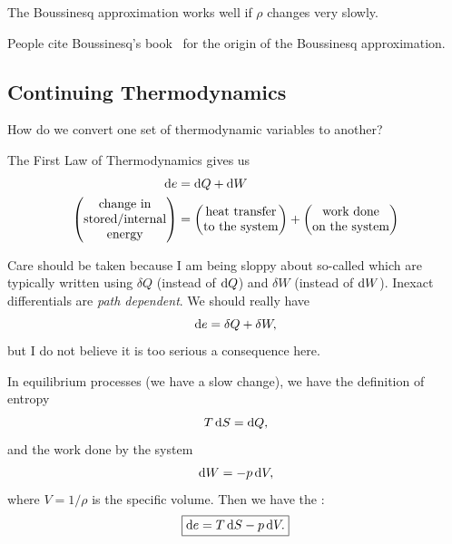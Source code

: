 \begin{caution}
The Boussinesq approximation works well if $\rho$ changes very slowly.
\end{caution}

\begin{remark}
People cite Boussinesq's book~\cite{boussinesq1897theorie} for the origin of the Boussinesq
approximation. 
\end{remark}

\subsection{Continuing Thermodynamics}

\begin{puzzle}
How do we convert one set of thermodynamic variables to another?
\end{puzzle}

\begin{law}[First]
The First Law of Thermodynamics gives us
\begin{align}
\mathrm{d} e &= \mathrm{d} Q + \mathrm{d} W\\
\begin{pmatrix}
\mbox{change in}\\
\mbox{stored/internal}\\
\mbox{energy}
\end{pmatrix} &= \begin{pmatrix}\mbox{heat transfer}\\
\mbox{to the system}
\end{pmatrix}
+ \begin{pmatrix}\mbox{work done}\\
\mbox{on the system}
\end{pmatrix}\nonumber
\end{align}
\end{law}

\begin{caution}
Care should be taken because I am being sloppy about so-called
 which are typically written using
$\delta Q$ (instead of $\mathrm{d} Q$) and $\delta W$ (instead of $\mathrm{d} W$).
Inexact differentials are \emph{path dependent}. We should really have
\begin{equation}
\mathrm{d} e = \delta Q + \delta W,
\end{equation}
but I do not believe it is too serious a consequence here.
\end{caution}

\begin{node}
In equilibrium processes (we have a slow change), we have the
definition of entropy
\begin{equation}
T\,\mathrm{d} S = \mathrm{d} Q,
\end{equation}
and the work done by the system
\begin{equation}
\mathrm{d} W = -p\,\mathrm{d} V,
\end{equation}
where $V=1/\rho$ is the specific volume. Then we have the
:
\begin{equation}\label{eq:canonical-eqn-of-state}
\boxed{\mathrm{d} e = T\,\mathrm{d} S - p\,\mathrm{d} V.}
\end{equation}
\end{node}

